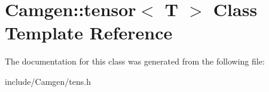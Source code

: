 \hypertarget{a00526}{\section{Camgen\-:\-:tensor$<$ T $>$ Class Template Reference}
\label{a00526}
}


The documentation for this class was generated from the following file\-:\begin{DoxyCompactItemize}
\item 
include/\-Camgen/tens.\-h\end{DoxyCompactItemize}
